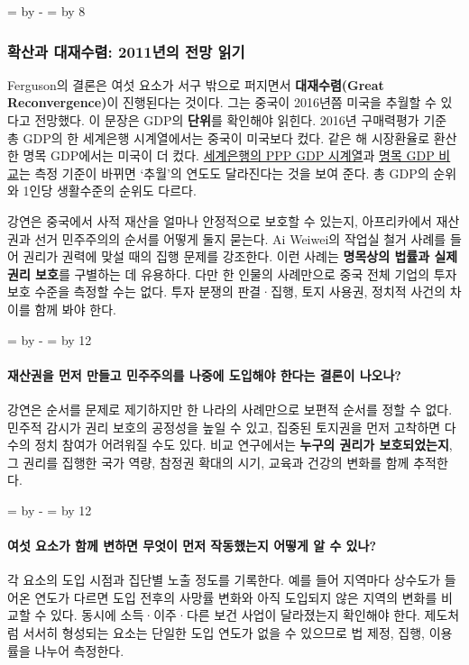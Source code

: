 \documentclass[10pt,a4paper]{article}
\newcommand{\ReserveQuestionSpace}{%
  \par\begingroup
  \dimen0=\pagegoal \advance\dimen0 by -\pagetotal
  \dimen2=\baselineskip \multiply\dimen2 by 12
  \ifdim\dimen0<\dimen2 \newpage\fi
  \endgroup}
\newcommand{\ReserveReadingSectionSpace}{%
  \par\begingroup
  \dimen0=\pagegoal \advance\dimen0 by -\pagetotal
  \dimen2=\baselineskip \multiply\dimen2 by 8
  \ifdim\dimen0<\dimen2 \newpage\fi
  \endgroup}
\begin{document}
\ReserveReadingSectionSpace
\subsubsection*{확산과 대재수렴: 2011년의 전망 읽기}

Ferguson의 결론은 여섯 요소가 서구 밖으로 퍼지면서 \textbf{대재수렴(Great Reconvergence)}이 진행된다는 것이다. 그는 중국이 2016년쯤 미국을 추월할 수 있다고 전망했다. 이 문장은 GDP의 \textbf{단위}를 확인해야 읽힌다. 2016년 구매력평가 기준 총 GDP의 한 세계은행 시계열에서는 중국이 미국보다 컸다. 같은 해 시장환율로 환산한 명목 GDP에서는 미국이 더 컸다. \href{https://wits.worldbank.org/countryprofile/en/country/ALL/startyear/2012/endyear/2016/indicator/NY-GDP-MKTP-PP-KD}{세계은행의 PPP GDP 시계열}과 \href{https://databank.worldbank.org/china-vs-usa-in-gdp/id/85f3bc70}{명목 GDP 비교}는 측정 기준이 바뀌면 ‘추월’의 연도도 달라진다는 것을 보여 준다. 총 GDP의 순위와 1인당 생활수준의 순위도 다르다.\par

강연은 중국에서 사적 재산을 얼마나 안정적으로 보호할 수 있는지, 아프리카에서 재산권과 선거 민주주의의 순서를 어떻게 둘지 묻는다. Ai Weiwei의 작업실 철거 사례를 들어 권리가 권력에 맞설 때의 집행 문제를 강조한다. 이런 사례는 \textbf{명목상의 법률과 실제 권리 보호}를 구별하는 데 유용하다. 다만 한 인물의 사례만으로 중국 전체 기업의 투자 보호 수준을 측정할 수는 없다. 투자 분쟁의 판결·집행, 토지 사용권, 정치적 사건의 차이를 함께 봐야 한다.\par

\ReserveQuestionSpace
\paragraph{재산권을 먼저 만들고 민주주의를 나중에 도입해야 한다는 결론이 나오나?}
강연은 순서를 문제로 제기하지만 한 나라의 사례만으로 보편적 순서를 정할 수 없다. 민주적 감시가 권리 보호의 공정성을 높일 수 있고, 집중된 토지권을 먼저 고착하면 다수의 정치 참여가 어려워질 수도 있다. 비교 연구에서는 \textbf{누구의 권리가 보호되었는지}, 그 권리를 집행한 국가 역량, 참정권 확대의 시기, 교육과 건강의 변화를 함께 추적한다.\par

\ReserveQuestionSpace
\paragraph{여섯 요소가 함께 변하면 무엇이 먼저 작동했는지 어떻게 알 수 있나?}
각 요소의 도입 시점과 집단별 노출 정도를 기록한다. 예를 들어 지역마다 상수도가 들어온 연도가 다르면 도입 전후의 사망률 변화와 아직 도입되지 않은 지역의 변화를 비교할 수 있다. 동시에 소득·이주·다른 보건 사업이 달라졌는지 확인해야 한다. 제도처럼 서서히 형성되는 요소는 단일한 도입 연도가 없을 수 있으므로 법 제정, 집행, 이용률을 나누어 측정한다.\par
\end{document}
